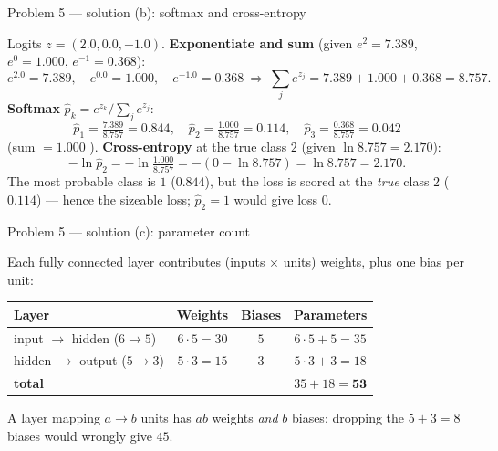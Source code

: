 \documentclass[aspectratio=169,11pt]{beamer}
\begin{document}
\begin{frame}{Problem 5 --- solution (b): softmax and cross-entropy}
  \begin{solutionbox}
    Logits $z=(2.0,0.0,-1.0)$. \textbf{Exponentiate and sum} (given $e^2=7.389$, $e^0=1.000$,
    $e^{-1}=0.368$):
    \[
      e^{2.0}=7.389,\quad e^{0.0}=1.000,\quad e^{-1.0}=0.368
      \ \Longrightarrow\ \textstyle\sum_j e^{z_j}=7.389+1.000+0.368=8.757.
    \]
    \textbf{Softmax} $\hat p_k=e^{z_k}/\sum_j e^{z_j}$:
    \[
      \hat p_1=\tfrac{7.389}{8.757}=\mathbf{0.844},\quad
      \hat p_2=\tfrac{1.000}{8.757}=\mathbf{0.114},\quad
      \hat p_3=\tfrac{0.368}{8.757}=\mathbf{0.042}
    \]
    (sum $=1.000$ \checkmark). \textbf{Cross-entropy} at the true class $2$ (given $\ln8.757=2.170$):
    \[
      -\ln\hat p_2=-\ln\tfrac{1.000}{8.757}=-(0-\ln8.757)=\ln8.757=\mathbf{2.170}.
    \]
    The most probable class is $1$ ($0.844$), but the loss is scored at the \emph{true} class $2$
    ($0.114$) --- hence the sizeable loss; $\hat p_2=1$ would give loss $0$.
  \end{solutionbox}
\end{frame}

\begin{frame}{Problem 5 --- solution (c): parameter count}
  \begin{solutionbox}
    Each fully connected layer contributes (inputs $\times$ units) weights, plus one bias per
    unit:
    \begin{center}
    \begin{tabular}{@{}lccc@{}}
      \toprule
      Layer & Weights & Biases & Parameters\\
      \midrule
      input $\to$ hidden ($6\to5$) & $6\cdot5=30$ & $5$ & $6\cdot5+5=35$\\
      hidden $\to$ output ($5\to3$) & $5\cdot3=15$ & $3$ & $5\cdot3+3=18$\\
      \midrule
      \textbf{total} & & & $35+18=\mathbf{53}$\\
      \bottomrule
    \end{tabular}
    \end{center}
    \begin{takeaway}
      A layer mapping $a\to b$ units has $ab$ weights \emph{and} $b$ biases; dropping the $5+3=8$
      biases would wrongly give $45$.
    \end{takeaway}
  \end{solutionbox}
\end{frame}
\end{document}
